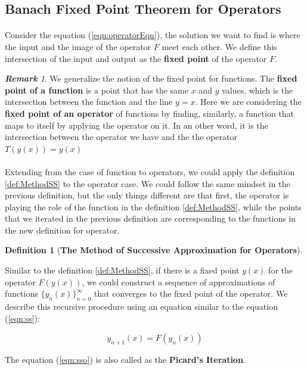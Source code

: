 \documentclass{article}
\theoremstyle{definition}
\newtheorem{definition}{Definition}[section]
\theoremstyle{remark}
\newtheorem*{remark}{\textbf{Remark}}
\begin{document}
\subsection{Banach Fixed Point Theorem for Operators}

\paragraph{  }

Consider the equation (\ref{eqn:operatorEqn}), the solution we want to find is where the input and the image of the operator $F$ meet each other. We define this intersection of the input and output as the \textbf{fixed point} of the operator $F$. 

\begin{remark}

We generalize the notion of the fixed point for functions. The \textbf{fixed point of a function} is a point that has the same $x$ and $y$ values, which is the intersection between the function and the line $y = x$. Here we are considering the \textbf{fixed point of an operator} of functions by finding, similarly, a function that maps to itself by applying the operator on it. In an other word, it is the intersection between the operator we have and the the operator $T(y(x)) = y(x)$

\end{remark}

\paragraph{  }

Extending from the case of function to operators, we could apply the definition \ref{def:MethodSS} to the operator case. We could follow the same mindset in the previous definition, but the only things different are that first, the operator is playing the role of the function in the definition \ref{def:MethodSS}, while the points that we iterated in the previous definition are corresponding to the functions in the new definition for operator.

\begin{definition}[\textbf{The Method of Successive Approximation for Operators}]\label{def:methodSSO}

Similar to the definition \ref{def:MethodSS}, if there is a fixed point $y(x)$ for the operator $F(y(x))$, we could construct a sequence of approximations of functions $\{y_n(x)\}_{n=0}^{\infty}$ that converges to the fixed point of the operator. We describe this recursive procedure using an equation similar to the equation (\ref{eqn:ss}):

\begin{equation}\label{eqn:sso}
    y_{n+1}(x) = F(y_n(x))
\end{equation}

The equation (\ref{eqn:sso}) is also called as the \textbf{Picard's Iteration}.

\end{definition}
\end{document}
